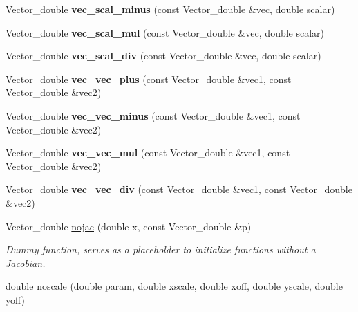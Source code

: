 \begin{DoxyCompactItemize}
\item 
\hypertarget{group__stfgen_ga635ebb6f8676ca855fe93b83028efafc}{
Vector\_\-double {\bfseries vec\_\-scal\_\-minus} (const Vector\_\-double \&vec, double scalar)}
\label{group__stfgen_ga635ebb6f8676ca855fe93b83028efafc}

\item 
\hypertarget{group__stfgen_ga1d3019104e48837b3e73441bf3c114f8}{
Vector\_\-double {\bfseries vec\_\-scal\_\-mul} (const Vector\_\-double \&vec, double scalar)}
\label{group__stfgen_ga1d3019104e48837b3e73441bf3c114f8}

\item 
\hypertarget{group__stfgen_ga2b8a0bf817a5cae1752bd5f5adb1b6bc}{
Vector\_\-double {\bfseries vec\_\-scal\_\-div} (const Vector\_\-double \&vec, double scalar)}
\label{group__stfgen_ga2b8a0bf817a5cae1752bd5f5adb1b6bc}

\item 
\hypertarget{group__stfgen_ga51d7332f01697cfc06f2bd5b52c52f15}{
Vector\_\-double {\bfseries vec\_\-vec\_\-plus} (const Vector\_\-double \&vec1, const Vector\_\-double \&vec2)}
\label{group__stfgen_ga51d7332f01697cfc06f2bd5b52c52f15}

\item 
\hypertarget{group__stfgen_ga9c715d4f5927507dc34eaeeea0840968}{
Vector\_\-double {\bfseries vec\_\-vec\_\-minus} (const Vector\_\-double \&vec1, const Vector\_\-double \&vec2)}
\label{group__stfgen_ga9c715d4f5927507dc34eaeeea0840968}

\item 
\hypertarget{group__stfgen_ga1ee73a2a48f6d19a94e77fe33d8fd664}{
Vector\_\-double {\bfseries vec\_\-vec\_\-mul} (const Vector\_\-double \&vec1, const Vector\_\-double \&vec2)}
\label{group__stfgen_ga1ee73a2a48f6d19a94e77fe33d8fd664}

\item 
\hypertarget{group__stfgen_gaa34bbc6c34b76d8f2d7ec80f6afc9164}{
Vector\_\-double {\bfseries vec\_\-vec\_\-div} (const Vector\_\-double \&vec1, const Vector\_\-double \&vec2)}
\label{group__stfgen_gaa34bbc6c34b76d8f2d7ec80f6afc9164}

\item 
\hypertarget{group__stfgen_ga0dd74b65e47d94acfc41705c9c4dd872}{
Vector\_\-double \hyperlink{group__stfgen_ga0dd74b65e47d94acfc41705c9c4dd872}{nojac} (double x, const Vector\_\-double \&p)}
\label{group__stfgen_ga0dd74b65e47d94acfc41705c9c4dd872}

\begin{DoxyCompactList}\small\item\em Dummy function, serves as a placeholder to initialize functions without a Jacobian. \item\end{DoxyCompactList}\item 
\hypertarget{group__stfgen_gafdb0668b03431e76286bbf94363d70bc}{
double \hyperlink{group__stfgen_gafdb0668b03431e76286bbf94363d70bc}{noscale} (double param, double xscale, double xoff, double yscale, double yoff)}
\label{group__stfgen_gafdb0668b03431e76286bbf94363d70bc}


\end{DoxyCompactItemize}
